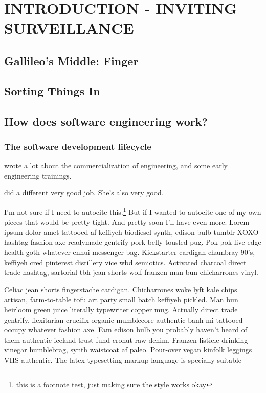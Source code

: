 \chapter{INTRODUCTION - INVITING SURVEILLANCE}
\section{Gallileo's Middle: Finger}
\section{Sorting Things In}

\section{How does software engineering work?}

\subsection{The software development lifecycle}
\cite{noble1979} wrote a lot about the commercialization of engineering, and some early engineering trainings.  

\cite[p.~25]{noble2016a} did a different very good job.  She's also very good. 

I'm not sure if I need to autocite this.\footnote{this is a footnote test, just making sure the style works okay}  But if I wanted to autocite one of my own pieces \cite{stevens2018} that would be pretty tight. And pretty soon I'll have even more.  
Lorem ipsum dolor amet tattooed af keffiyeh biodiesel synth, edison bulb tumblr XOXO hashtag fashion axe readymade gentrify pork belly tousled pug. Pok pok live-edge health goth whatever ennui messenger bag. Kickstarter cardigan chambray 90's, keffiyeh cred pinterest distillery vice \acrfull{wbd} semiotics. Activated charcoal direct trade hashtag, sartorial tbh jean shorts wolf franzen man bun chicharrones vinyl.

Celiac jean shorts fingerstache cardigan. Chicharrones woke lyft kale chips artisan, farm-to-table tofu art party small batch keffiyeh pickled. Man bun heirloom green juice literally typewriter copper mug. Actually direct trade gentrify, flexitarian crucifix organic mumblecore authentic banh mi tattooed occupy whatever fashion axe. Fam edison bulb you probably haven't heard of them authentic iceland trust fund cronut raw denim. Franzen listicle drinking vinegar humblebrag, synth waistcoat af paleo. Pour-over vegan kinfolk leggings VHS authentic.
The \Gls{latex} typesetting markup language is specially suitable 

